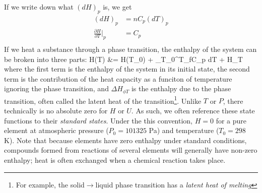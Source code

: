 \documentclass[12pt]{article}
\begin{document}
If we write down what $(dH)_p$ is, we get
\begin{align*}
(dH)_p &= n C_p (dT)_p\\
\frac{\partial H}{\partial T}|_p &= C_p\\
\end{align*}
If we heat a substance through a phase transition, the enthalpy of the system can be broken into three parts:
\eqs
H(T) &= H(T_0) +  \int_{T_0}^{T_f}C_p  dT + \Delta H_{\phi T}
\eqe
where the first term is the enthalpy of the system in its initial state, the second term is the contribution of the heat capacity as a funciton of temperature ignoring the phase transition, and $\Delta H_{\phi T}$ is the enthalpy due to the phase transition, often called the latent heat of the transition\footnote{For example, the solid$\to$liquid phase transition has a \emph{latent heat of melting}}.  Unlike $T$ or $P$, there technically is no absolute zero for $H$ or $U$.  As such, we often reference these state functions to their \emph{standard states}. Under the this convention, $H=0$ for a pure element at atmospheric pressure ($P_0 = 101325$ Pa) and temperature ($T_0 = 298$ K). Note that because elements have zero enthalpy under standard conditions, compounds formed from reactions of several elements will generally have non-zero enthalpy; heat is often exchanged when a chemical reaction takes place.\\
\end{document}

